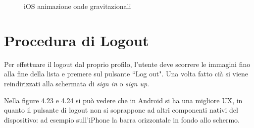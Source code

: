 \begin{figure}[H]
\begin{minipage}[h]{0.47\textwidth}
        \caption{\label{infoPointIphone} iOS animazione onde gravitazionali}
    \end{minipage}
\end{figure}

\section*{Procedura di Logout}
Per effettuare il logout dal proprio profilo, l'utente deve scorrere le immagini fino alla fine della lista e premere sul pulsante ``Log out". Una volta fatto ci\`a si viene reindirizzati alla schermata di \textit{sign in} o \textit{sign up}.

Nella figure 4.23 e 4.24 si pu\`o vedere che in Android si ha una migliore UX, in quanto il pulsante di logout non si soprappone ad altri componenti nativi del dispositivo: ad esempio sull'iPhone la barra orizzontale in fondo allo schermo. 
